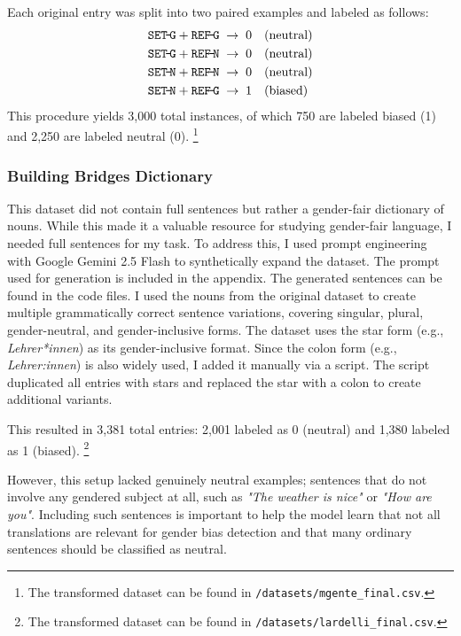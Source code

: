 Each original entry was split into two paired examples and labeled as follows:  
\[
\begin{aligned}
\texttt{SET\!-\!G} + \texttt{REF\!-\!G} &\;\rightarrow\; 0 \quad(\text{neutral})\\
\texttt{SET\!-\!G} + \texttt{REF\!-\!N} &\;\rightarrow\; 0 \quad(\text{neutral})\\
\texttt{SET\!-\!N} + \texttt{REF\!-\!N} &\;\rightarrow\; 0 \quad(\text{neutral})\\
\texttt{SET\!-\!N} + \texttt{REF\!-\!G} &\;\rightarrow\; 1 \quad(\text{biased})
\end{aligned}
\]  
This procedure yields 3,000 total instances, of which 750 are labeled biased (1) and 2,250 are labeled neutral (0). \footnote{The transformed dataset can be found in \texttt{/datasets/mgente\_final.csv}.} 

\subsubsection{Building Bridges Dictionary} 
This dataset did not contain full sentences but rather a gender-fair dictionary of nouns. While this made it a valuable resource for studying gender-fair language, I needed full sentences for my task. To address this, I used prompt engineering with Google Gemini 2.5 Flash to synthetically expand the dataset. The prompt used for generation is included in the appendix. The generated sentences can be found in the code files. I used the nouns from the original dataset to create multiple grammatically correct sentence variations, covering singular, plural, gender-neutral, and gender-inclusive forms. The dataset uses the star form (e.g., \textit{Lehrer*innen}) as its gender-inclusive format. Since the colon form (e.g., \textit{Lehrer:innen}) is also widely used, I added it manually via a script. The script duplicated all entries with stars and replaced the star with a colon to create additional variants.

This resulted in 3,381 total entries: 2,001 labeled as 0 (neutral) and 1,380 labeled as 1 (biased). \footnote{The transformed dataset can be found in \texttt{/datasets/lardelli\_final.csv}.}

However, this setup lacked genuinely neutral examples; sentences that do not involve any gendered subject at all, such as \textit{"The weather is nice"} or \textit{"How are you"}. Including such sentences is important to help the model learn that not all translations are relevant for gender bias detection and that many ordinary sentences should be classified as neutral.

